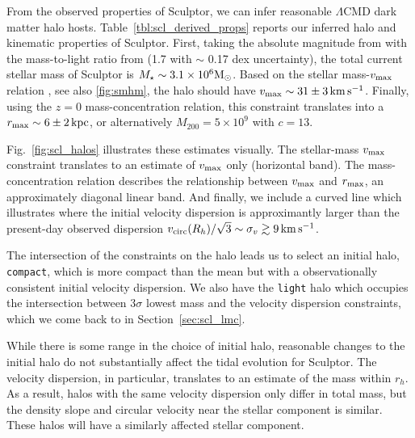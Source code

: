From the observed properties of Sculptor, we can infer reasonable
\(\Lambda\)CMD dark matter halo hosts. Table~\ref{tbl:scl_derived_props}
reports our inferred halo and kinematic properties of Sculptor. First,
taking the absolute magnitude from \citet{munoz+2018} with the
mass-to-light ratio from \citet{woo+courteau+dekel2008} (1.7 with
\(\sim\) 0.17 dex uncertainty), the total current stellar mass of
Sculptor is \(M_\star \sim 3.1 \times 10^6 {\rm M}_{\odot}\). Based on the stellar
mass-\(v_{\rm max}\) relation \citep[from][]{fattahi+2018}, see also
\ref{fig:smhm}, the halo should have
\(v_{\rm max} \sim 31 \pm 3 \,{\rm km\,s^{-1}}\). Finally, using the
\citet{ludlow+2016} \(z=0\) mass-concentration relation, this constraint
translates into a \(r_{\rm max} \sim 6 \pm 2\,{\rm kpc}\), or
alternatively \(M_{200} = 5\times10^9\) with \(c=13\).

Fig.~\ref{fig:scl_halos} illustrates these estimates visually. The
stellar-mass \(v_{\rm max}\) constraint translates to an estimate of
\(v_{\rm max}\) only (horizontal band). The mass-concentration relation
describes the relationship between \(v_{\rm max}\) and \(r_{\rm max}\),
an approximately diagonal linear band. And finally, we include a curved
line which illustrates where the initial velocity dispersion is
approximantly larger than the present-day observed dispersion
\(v_{\rm circ}(R_h) / \sqrt{3} \sim \sigma_v \gtrsim 9\,{\rm km\,s^{-1}}\).

The intersection of the constraints on the halo leads us to select an
initial halo, \texttt{compact}, which is more compact than the mean but
with a observationally consistent initial velocity dispersion. We also
have the \texttt{light} halo which occupies the intersection between
3\(\sigma\) lowest mass and the velocity dispersion constraints, which
we come back to in Section~\ref{sec:scl_lmc}.

While there is some range in the choice of initial halo, reasonable
changes to the initial halo do not substantially affect the tidal
evolution for Sculptor. The velocity dispersion, in particular,
translates to an estimate of the mass within \(r_h\). As a result, halos
with the same velocity dispersion only differ in total mass, but the
density slope and circular velocity near the stellar component is
similar. These halos will have a similarly affected stellar component.

